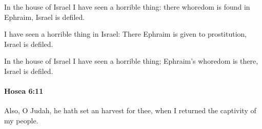 			\begin{versebox}
					\item[BHS] 
					\item[LXX] 
					\item[ASV] In the house of Israel I have seen a horrible thing: there whoredom is found in Ephraim, Israel is defiled.
					\item[NIV] I have seen a horrible thing in Israel: There Ephraim is given to prostitution, Israel is defiled.
					\item[NRSV] In the house of Israel I have seen a horrible thing; Ephraim’s whoredom is there, Israel is defiled.
			\end{versebox}

		\paragraph{Hosea 6:11} %
			\label{HOSEA-6-11}

			Also, O Judah, he hath set an harvest for thee, when I returned the captivity of my people.

